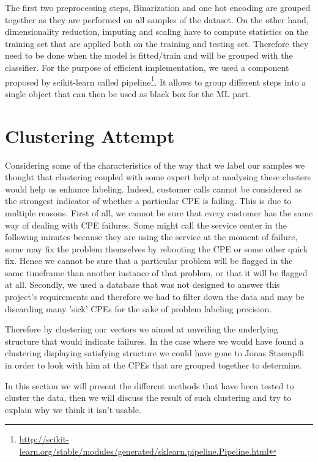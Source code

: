 \vspace{1\baselineskip}
The first two preprocessing steps, Binarization and one hot encoding are grouped together as they are performed on all samples of the dataset. On the other hand, dimensionality reduction, imputing and scaling have to compute statistics on the training set that are applied both on the training and testing set. Therefore they need to be done when the model is fitted/train and will be grouped with the classifier. For the purpose of efficient implementation, we used a component proposed by scikit-learn called pipeline\footnote{\url{http://scikit-learn.org/stable/modules/generated/sklearn.pipeline.Pipeline.html}}. It allows to group different steps into a single object that can then be used as black box for the ML part. 

\section{Clustering Attempt}
Considering some of the characteristics of the way that we label our samples we thought that clustering coupled with some expert help at analysing these clusters would help us enhance labeling. Indeed, customer calls cannot be considered as the strongest indicator of whether a particular CPE is failing. This is due to multiple reasons. First of all, we cannot be sure that every customer has the same way of dealing with CPE failures. Some might call the service center in the following minutes because they are using the service at the moment of failure, some may fix the problem themselves by rebooting the CPE or some other quick fix. Hence we cannot be sure that a particular problem will be flagged in the same timeframe than another instance of that problem, or that it will be flagged at all. Secondly, we used a database that was not designed to answer this project's requirements and therefore we had to filter down the data and may be discarding many 'sick' CPEs for the sake of problem labeling precision. 

Therefore by clustering our vectors we aimed at unveiling the underlying structure that would indicate failures. In the case where we would have found a clustering displaying satisfying structure we could have gone to Jonas Staempfli in order to look with him at the CPEs that are grouped together to determine.

In this section we will present the different methods that have been tested to cluster the data, then we will discuss the result of such clustering and try to explain why we think it isn't usable.


